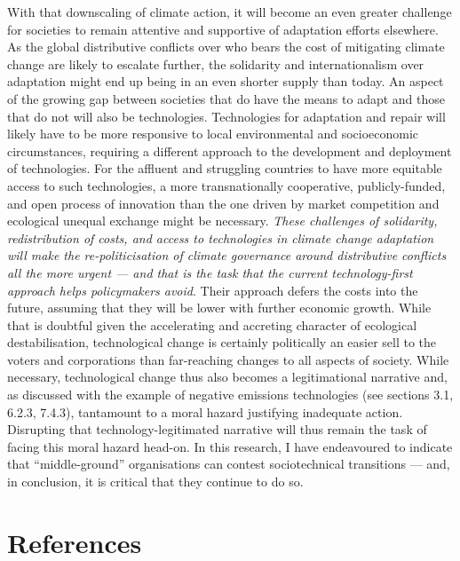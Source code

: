 \documentclass[a4paper, nobind]{templates/ociamthesis}
\begin{document}
With that downscaling of climate action, it will become an even greater challenge for societies to remain attentive and supportive of adaptation efforts elsewhere. As the global distributive conflicts over who bears the cost of mitigating climate change are likely to escalate further, the solidarity and internationalism over adaptation might end up being in an even shorter supply than today. An aspect of the growing gap between societies that do have the means to adapt and those that do not will also be technologies. Technologies for adaptation and repair will likely have to be more responsive to local environmental and socioeconomic circumstances, requiring a different approach to the development and deployment of technologies. For the affluent and struggling countries to have more equitable access to such technologies, a more transnationally cooperative, publicly-funded, and open process of innovation than the one driven by market competition and ecological unequal exchange might be necessary. \emph{These challenges of solidarity, redistribution of costs, and access to technologies in climate change adaptation will make the re-politicisation of climate governance around distributive conflicts all the more urgent --- and that is the task that the current technology-first approach helps policymakers avoid}. Their approach defers the costs into the future, assuming that they will be lower with further economic growth. While that is doubtful given the accelerating and accreting character of ecological destabilisation, technological change is certainly politically an easier sell to the voters and corporations than far-reaching changes to all aspects of society. While necessary, technological change thus also becomes a legitimational narrative and, as discussed with the example of negative emissions technologies (see sections 3.1, 6.2.3, 7.4.3), tantamount to a moral hazard justifying inadequate action. Disrupting that technology-legitimated narrative will thus remain the task of facing this moral hazard head-on. In this research, I have endeavoured to indicate that ``middle-ground'' organisations can contest sociotechnical transitions --- and, in conclusion, it is critical that they continue to do so.

\hypertarget{references}{%
\chapter{References}\label{references}}
\end{document}
